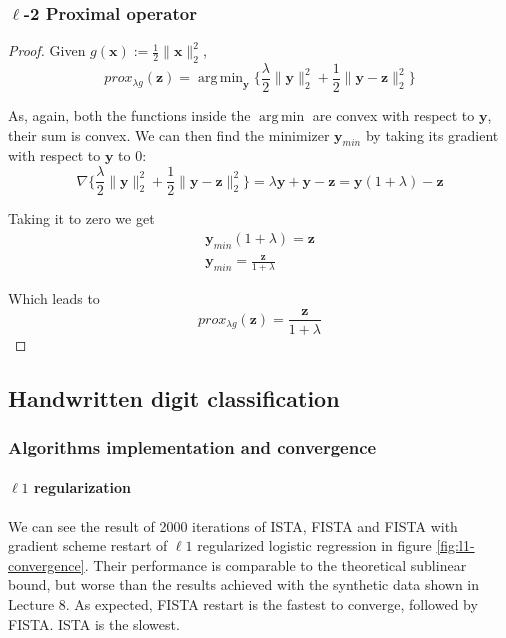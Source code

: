 \documentclass[12pt]{article}
\DeclareMathOperator*{\argmin}{arg\,min}
\begin{document}
\subsubsection{\texorpdfstring{$\ell$}{Lg}-2 Proximal operator}
\begin{proof}
Given $g(\mathbf{x}) := \frac{1}{2} \lVert \mathbf{x} \rVert_{2}^{2}$,
\begin{equation}
    prox_{\lambda g}(\mathbf{z}) = \argmin_{\mathbf{y}} \{\frac{\lambda}{2} \lVert \mathbf{y} \rVert_2^2 + \frac{1}{2} \lVert \mathbf{y} - \mathbf{z} \rVert_2^2 \}
\end{equation}

As, again, both the functions inside the $\argmin$ are convex with respect to $\mathbf{y}$, their sum is convex. We can then find the minimizer $\mathbf{y}_{min}$ by taking its gradient with respect to $\mathbf{y}$ to 0:
\begin{equation}
    \nabla \{\frac{\lambda}{2} \lVert \mathbf{y} \rVert_2^2 + \frac{1}{2} \lVert \mathbf{y} - \mathbf{z} \rVert_2^2 \} = \lambda \mathbf{y} + \mathbf{y} - \mathbf{z} = \mathbf{y}(1 + \lambda) - \mathbf{z}
\end{equation}

Taking it to zero we get
\begin{gather}
    \mathbf{y}_{min}(1 + \lambda) = \mathbf{z} \\
    \mathbf{y}_{min} = \frac{\mathbf{z}}{1 + \lambda}
\end{gather}

Which leads to
\begin{equation}
    prox_{\lambda g}(\mathbf{z}) = \frac{\mathbf{z}}{1 + \lambda}
\end{equation}
\end{proof}

\subsection{Handwritten digit classification}

\subsubsection{Algorithms implementation and convergence}
\paragraph{\texorpdfstring{$\ell1$ regularization}{Lg}}
We can see the result of 2000 iterations of ISTA, FISTA and FISTA with gradient scheme restart of $\ell1$ regularized logistic regression in figure \ref{fig:l1-convergence}. Their performance is comparable to the theoretical sublinear bound, but worse than the results achieved with the synthetic data shown in Lecture 8. As expected, FISTA restart is the fastest to converge, followed by FISTA. ISTA is the slowest.
\end{document}
